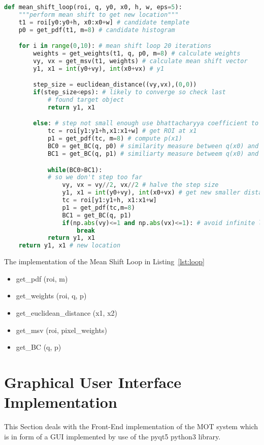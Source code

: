 \begin{lstlisting}[language=Python, caption={Mean Shift Loop}, captionpos=b, label={lst:loop}]
def mean_shift_loop(roi, q, y0, x0, h, w, eps=5):
    """perform mean shift to get new location"""
    t1 = roi[y0:y0+h, x0:x0+w] # candidate template
    p0 = get_pdf(t1, m=8) # candidate histogram

    for i in range(0,10): # mean shift loop 20 iterations
        weights = get_weights(t1, q, p0, m=8) # calculate weights
        vy, vx = get_msv(t1, weights) # calculate mean shift vector
        y1, x1 = int(y0+vy), int(x0+vx) # y1

        step_size = euclidean_distance((vy,vx),(0,0))
        if(step_size<eps): # likely to converge so check last
            # found target object
            return y1, x1

        else: # step not small enough use bhattacharyya coefficient to refine step
            tc = roi[y1:y1+h,x1:x1+w] # get ROI at x1
            p1 = get_pdf(tc, m=8) # compute p(x1)
            BC0 = get_BC(q, p0) # similarity measure between q(x0) and p(x0) 
            BC1 = get_BC(q, p1) # similiarty measure betweem q(x0) and p(x1)

            while(BC0>BC1):
            # so we don't step too far
                vy, vx = vy//2, vx//2 # halve the step size
                y1, x1 = int(y0+vy), int(x0+vx) # get new smaller distance 
                tc = roi[y1:y1+h, x1:x1+w]
                p1 = get_pdf(tc,m=8)
                BC1 = get_BC(q, p1)
                if(np.abs(vy)<=1 and np.abs(vx)<=1): # avoid infinite loop
                    break
            return y1, x1
    return y1, x1 # new location
\end{lstlisting}

The implementation of the Mean Shift Loop in Listing~\ref{lst:loop} 
\begin{itemize}
    \item get\_pdf (roi, m)
    \item get\_weights (roi, q, p)
    \item get\_euclidean\_distance (x1, x2)
    \item get\_msv (roi, pixel\_weights)
    \item get\_BC (q, p)
\end{itemize}


\section{Graphical User Interface Implementation}
This Section deals with the Front-End implementation of the MOT system which is
in form of a GUI implemented by use of the pyqt5 python3 library.




